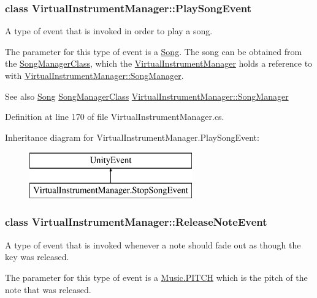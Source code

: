 \subsubsection{class Virtual\+Instrument\+Manager\+:\+:Play\+Song\+Event}
A type of event that is invoked in order to play a song. 

The parameter for this type of event is a \hyperlink{class_song}{Song}. The song can be obtained from the \hyperlink{class_song_manager_class}{Song\+Manager\+Class}, which the \hyperlink{class_virtual_instrument_manager}{Virtual\+Instrument\+Manager} holds a reference to with \hyperlink{group___v_i_m_pub_ga33dae94932c10c66db76a0eebec76b01}{Virtual\+Instrument\+Manager\+::\+Song\+Manager}.

\begin{DoxySeeAlso}{See also}
\hyperlink{class_song}{Song} \hyperlink{class_song_manager_class}{Song\+Manager\+Class} \hyperlink{group___v_i_m_pub_ga33dae94932c10c66db76a0eebec76b01}{Virtual\+Instrument\+Manager\+::\+Song\+Manager} 
\end{DoxySeeAlso}


Definition at line 170 of file Virtual\+Instrument\+Manager.\+cs.

Inheritance diagram for Virtual\+Instrument\+Manager.\+Play\+Song\+Event\+:\begin{figure}[H]
\begin{center}
\leavevmode
\includegraphics[height=2.000000cm]{group___v_i_m_event_types}
\end{center}
\end{figure}
\label{class_virtual_instrument_manager_1_1_release_note_event}
\subsubsection{class Virtual\+Instrument\+Manager\+:\+:Release\+Note\+Event}
A type of event that is invoked whenever a note should fade out as though the key was released. 

The parameter for this type of event is a \hyperlink{group___music_enums_ga508f69b199ea518f935486c990edac1d}{Music.\+P\+I\+T\+CH} which is the pitch of the note that was released.


